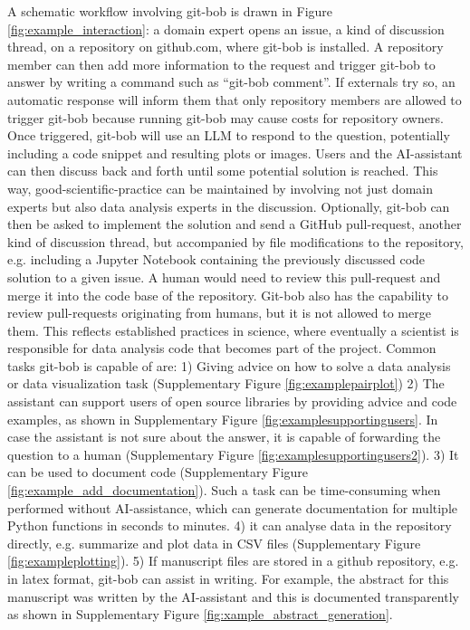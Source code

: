 \documentclass[times, twoside]{zHenriquesLab-StyleBioRxiv}
\begin{document}
A schematic workflow involving git-bob is drawn in Figure \ref{fig:example_interaction}: a domain expert opens an issue, a kind of discussion thread, on a repository on github.com, where git-bob is installed. A repository member can then add more information to the request and trigger git-bob to answer by writing a command such as ``git-bob comment''. If externals try so, an automatic response will inform them that only repository members are allowed to trigger git-bob because running git-bob may cause costs for repository owners. Once triggered, git-bob will use an LLM to respond to the question, potentially including a code snippet and resulting plots or images. Users and the AI-assistant can then discuss back and forth until some potential solution is reached. This way, good-scientific-practice can be maintained by involving not just domain experts but also data analysis experts in the discussion. Optionally, git-bob can then be asked to implement the solution and send a GitHub pull-request, another kind of discussion thread, but accompanied by file modifications to the repository, e.g. including a Jupyter Notebook containing the previously discussed code solution to a given issue. A human would need to review this pull-request and merge it into the code base of the repository. Git-bob also has the capability to review pull-requests originating from humans, but it is not allowed to merge them. This reflects established practices in science, where eventually a scientist is responsible for data analysis code that becomes part of the project. Common tasks git-bob is capable of are: 1) Giving advice on how to solve a data analysis or data visualization task (Supplementary Figure \ref{fig:examplepairplot}) 2) The assistant can support users of open source libraries by providing advice and code examples, as shown in Supplementary Figure \ref{fig:examplesupportingusers}. In case the assistant is not sure about the answer, it is capable of forwarding the question to a human \cite{yin2023largelanguagemodelsknow} (Supplementary Figure \ref{fig:examplesupportingusers2}). 3) It can be used to document code (Supplementary Figure \ref{fig:example_add_documentation}). Such a task can be time-consuming when performed without AI-assistance, which can generate documentation for multiple Python functions in seconds to minutes. 4) it can analyse data in the repository directly, e.g. summarize and plot data in CSV files (Supplementary Figure \ref{fig:exampleplotting}). 5) If manuscript files are stored in a github repository, e.g. in latex format, git-bob can assist in writing. For example, the abstract for this manuscript was written by the AI-assistant and this is documented transparently as shown in Supplementary Figure \ref{fig:xample_abstract_generation}.
\end{document}
